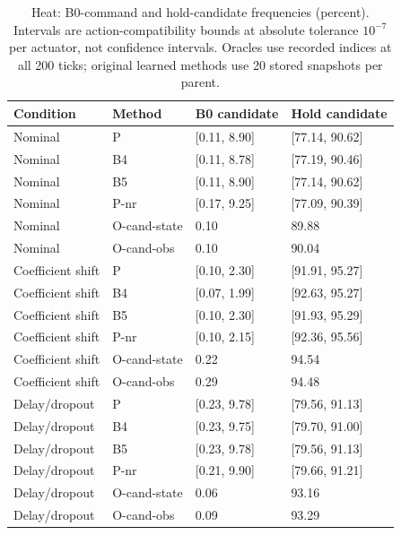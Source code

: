\begin{table}[ht]
\caption{Heat: B0-command and hold-candidate frequencies (percent). Intervals are action-compatibility bounds at absolute tolerance $10^{-7}$ per actuator, not confidence intervals. Oracles use recorded indices at all 200 ticks; original learned methods use 20 stored snapshots per parent.}\label{tab:choices_heat}
\centering\small
\begin{tabular}{@{}llll@{}}\toprule
Condition & Method & B0 candidate & Hold candidate\\\midrule
Nominal & P & [0.11, 8.90] & [77.14, 90.62] \\
Nominal & B4 & [0.11, 8.78] & [77.19, 90.46] \\
Nominal & B5 & [0.11, 8.90] & [77.14, 90.62] \\
Nominal & P-nr & [0.17, 9.25] & [77.09, 90.39] \\
Nominal & O-cand-state & 0.10 & 89.88 \\
Nominal & O-cand-obs & 0.10 & 90.04 \\
Coefficient shift & P & [0.10, 2.30] & [91.91, 95.27] \\
Coefficient shift & B4 & [0.07, 1.99] & [92.63, 95.27] \\
Coefficient shift & B5 & [0.10, 2.30] & [91.93, 95.29] \\
Coefficient shift & P-nr & [0.10, 2.15] & [92.36, 95.56] \\
Coefficient shift & O-cand-state & 0.22 & 94.54 \\
Coefficient shift & O-cand-obs & 0.29 & 94.48 \\
Delay/dropout & P & [0.23, 9.78] & [79.56, 91.13] \\
Delay/dropout & B4 & [0.23, 9.75] & [79.70, 91.00] \\
Delay/dropout & B5 & [0.23, 9.78] & [79.56, 91.13] \\
Delay/dropout & P-nr & [0.21, 9.90] & [79.66, 91.21] \\
Delay/dropout & O-cand-state & 0.06 & 93.16 \\
Delay/dropout & O-cand-obs & 0.09 & 93.29 \\
\bottomrule\end{tabular}
\end{table}
